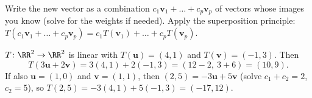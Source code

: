 \documentclass[10pt]{scrartcl}
\newcommand{\vv}[1]{\mathbf{#1}}
\begin{document}
\begin{steps}
  \ii Write the new vector as a combination $c_1\vv v_1+\dots+c_p\vv v_p$ of vectors whose images you know (solve for the weights if needed).
  \ii Apply the superposition principle: $T(c_1\vv v_1+\dots+c_p\vv v_p)=c_1T(\vv v_1)+\dots+c_pT(\vv v_p)$.
\end{steps}

\begin{example*}
$T\colon\RR^2\to\RR^2$ is linear with $T(\vv u)=(4,1)$ and $T(\vv v)=(-1,3)$. Then
\[
  T(3\vv u+2\vv v)=3(4,1)+2(-1,3)=(12-2,\ 3+6)=(10,9).
\]
If also $\vv u=(1,0)$ and $\vv v=(1,1)$, then $(2,5)=-3\vv u+5\vv v$ (solve $c_1+c_2=2$, $c_2=5$), so $T(2,5)=-3(4,1)+5(-1,3)=(-17,12)$.
\end{example*}
\end{document}
